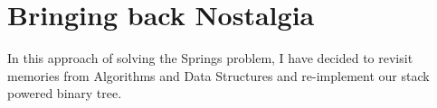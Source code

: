 \section{Bringing back Nostalgia}

In this approach of solving the Springs problem, I have decided to revisit memories from Algorithms and Data Structures and re-implement our stack powered binary tree.
